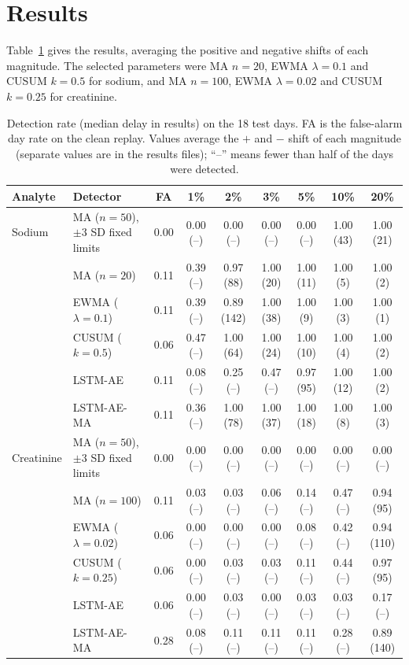 \documentclass[conference]{IEEEtran}
\begin{document}
\section{Results}
Table~\ref{experiment_result} gives the results, averaging the positive and negative shifts of each magnitude. The selected parameters were MA $n=20$, EWMA $\lambda=0.1$ and CUSUM $k=0.5$ for sodium, and MA $n=100$, EWMA $\lambda=0.02$ and CUSUM $k=0.25$ for creatinine.

\begin{table}[!t]
\centering
\renewcommand{\arraystretch}{1.15}
\setlength{\tabcolsep}{5pt}
\caption{Detection rate (median delay in results) on the 18 test days. FA is the false-alarm day rate on the clean replay. Values average the $+$ and $-$ shift of each magnitude (separate values are in the results files); ``--'' means fewer than half of the days were detected.}
\label{experiment_result}
\begin{tabular}{llc cccccc}
\toprule
\textbf{Analyte} & \textbf{Detector} & \textbf{FA} & \textbf{1\%} & \textbf{2\%} & \textbf{3\%} & \textbf{5\%} & \textbf{10\%} & \textbf{20\%} \\
\midrule
Sodium & MA ($n{=}50$), $\pm3$ SD fixed limits & 0.00 & 0.00 (--) & 0.00 (--) & 0.00 (--) & 0.00 (--) & 1.00 (43) & 1.00 (21) \\
 & MA ($n{=}20$) & 0.11 & 0.39 (--) & 0.97 (88) & 1.00 (20) & 1.00 (11) & 1.00 (5) & 1.00 (2) \\
 & EWMA ($\lambda{=}0.1$) & 0.11 & 0.39 (--) & 0.89 (142) & 1.00 (38) & 1.00 (9) & 1.00 (3) & 1.00 (1) \\
 & CUSUM ($k{=}0.5$) & 0.06 & 0.47 (--) & 1.00 (64) & 1.00 (24) & 1.00 (10) & 1.00 (4) & 1.00 (2) \\
 & LSTM-AE & 0.11 & 0.08 (--) & 0.25 (--) & 0.47 (--) & 0.97 (95) & 1.00 (12) & 1.00 (2) \\
 & LSTM-AE-MA & 0.11 & 0.36 (--) & 1.00 (78) & 1.00 (37) & 1.00 (18) & 1.00 (8) & 1.00 (3) \\
\midrule
Creatinine & MA ($n{=}50$), $\pm3$ SD fixed limits & 0.00 & 0.00 (--) & 0.00 (--) & 0.00 (--) & 0.00 (--) & 0.00 (--) & 0.00 (--) \\
 & MA ($n{=}100$) & 0.11 & 0.03 (--) & 0.03 (--) & 0.06 (--) & 0.14 (--) & 0.47 (--) & 0.94 (95) \\
 & EWMA ($\lambda{=}0.02$) & 0.06 & 0.00 (--) & 0.00 (--) & 0.00 (--) & 0.08 (--) & 0.42 (--) & 0.94 (110) \\
 & CUSUM ($k{=}0.25$) & 0.06 & 0.00 (--) & 0.03 (--) & 0.03 (--) & 0.11 (--) & 0.44 (--) & 0.97 (95) \\
 & LSTM-AE & 0.06 & 0.00 (--) & 0.03 (--) & 0.00 (--) & 0.03 (--) & 0.03 (--) & 0.17 (--) \\
 & LSTM-AE-MA & 0.28 & 0.08 (--) & 0.11 (--) & 0.11 (--) & 0.11 (--) & 0.28 (--) & 0.89 (140) \\
\bottomrule
\end{tabular}
\end{table}
\end{document}
